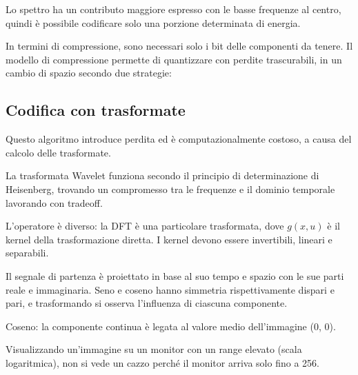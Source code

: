 Lo spettro ha un contributo maggiore espresso con le basse frequenze al centro, quindi è possibile codificare solo una porzione determinata di energia.

In termini di compressione, sono necessari solo i bit delle componenti da tenere. Il modello di compressione permette di quantizzare con perdite trascurabili, in un cambio di spazio secondo due strategie:

\subsection{Codifica con trasformate}
Questo algoritmo introduce perdita ed è computazionalmente costoso, a causa del calcolo delle trasformate. 

La trasformata Wavelet funziona secondo il principio di determinazione di Heisenberg, trovando un compromesso tra le frequenze e il dominio temporale lavorando con tradeoff.

L'operatore è diverso: la DFT è una particolare trasformata, dove $g(x, u)$ è il kernel della trasformazione diretta. I kernel devono essere invertibili, lineari e separabili.

Il segnale di partenza è proiettato in base al suo tempo e spazio con le sue parti reale e immaginaria. Seno e coseno hanno simmetria rispettivamente dispari e pari, e trasformando si osserva l'influenza di ciascuna componente. 

Coseno: la componente continua è legata al valore medio dell'immagine (0, 0). 

Visualizzando un'immagine su un monitor con un range elevato (scala logaritmica), non si vede un cazzo perché il monitor arriva solo fino a 256.




